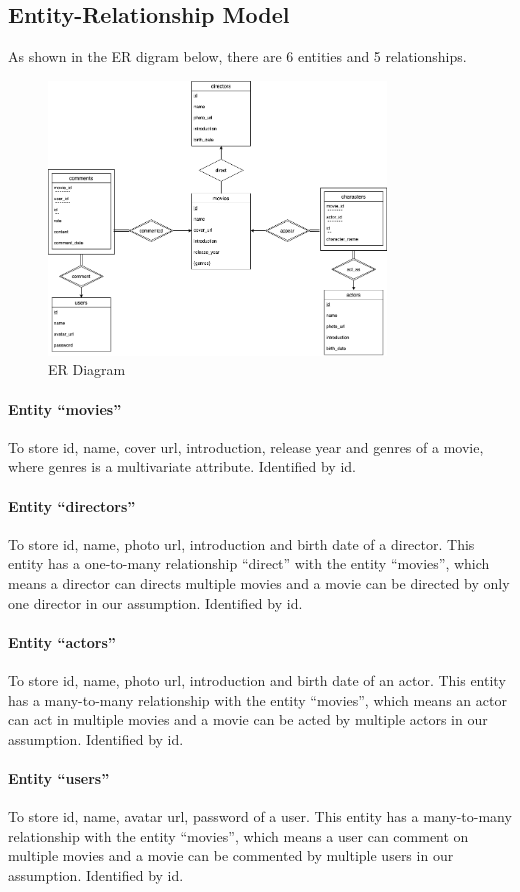 \begin{CJK*}{UTF8}{gbsn}
\subsection{Entity-Relationship Model}
As shown in the ER digram below, there are 6 entities and 5 relationships. 
\begin{figure}[h]
\centering
\includegraphics[width=0.8\textwidth]{er.png}
\caption{ER Diagram}
\end{figure}
\paragraph{Entity ``movies''}
To store id, name, cover url, introduction, release year and genres of a movie, where genres is a multivariate attribute. Identified by id. 
\paragraph{Entity ``directors''}
To store id, name, photo url, introduction and birth date of a director. This entity has a one-to-many relationship ``direct'' with the entity ``movies'', which means a director can directs multiple movies and a movie can be directed by only one director in our assumption. Identified by id. 
\paragraph{Entity ``actors''}
To store id, name, photo url, introduction and birth date of an actor. This entity has a many-to-many relationship with the entity ``movies'', which means an actor can act in multiple movies and a movie can be acted by multiple actors in our assumption. Identified by id. 
\paragraph{Entity ``users''}
To store id, name, avatar url, password of a user. This entity has a many-to-many relationship with the entity ``movies'', which means a user can comment on multiple movies and a movie can be commented by multiple users in our assumption. Identified by id. 

\end{CJK*}
